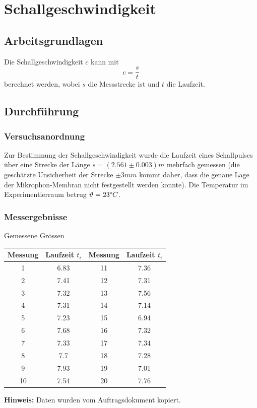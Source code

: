 \section{Schallgeschwindigkeit}

\subsection{Arbeitsgrundlagen}

Die Schallgeschwindigkeit $c$ kann mit
\[c=\frac{s}{t}\]
berechnet werden, wobei $s$ die Messstrecke ist und $t$ die Laufzeit.


\subsection{Durchf\"{u}hrung}

\subsubsection*{Versuchsanordnung}

Zur Bestimmung der Schallgeschwindigkeit wurde die Laufzeit eines Schallpulses \"{u}ber eine Strecke
der L\"{a}nge $s = (2.561 \pm 0.003) m$ mehrfach gemessen (die gesch\"{a}tzte Unsicherheit der Strecke $\pm 3 mm$
kommt daher, dass die genaue Lage der Mikrophon-Membran nicht festgestellt werden konnte). Die
Temperatur im Experimentierraum betrug $\vartheta=23 \degree C$.


\subsubsection*{Messergebnisse}
\begin{center}
    \begin{threeparttable}
        \caption{Gemessene Gr\"{o}ssen}
        \begin{tabular}{cccc}
            \toprule
            Messung & Laufzeit $t_i$ & Messung & Laufzeit $t_i$ \\
            \midrule
            1  & 6.83 & 11 & 7.36 \\
            2  & 7.41 & 12 & 7.31 \\
            3  & 7.32 & 13 & 7.56 \\
            4  & 7.31 & 14 & 7.14 \\
            5  & 7.23 & 15 & 6.94 \\
            6  & 7.68 & 16 & 7.32 \\
            7  & 7.33 & 17 & 7.34 \\
            8  & 7.7  & 18 & 7.28 \\
            9  & 7.93 & 19 & 7.01 \\
            10 & 7.54 & 20 & 7.76 \\
           \bottomrule
        \end{tabular}
        \begin{tablenotes}
            \small
            \item \textbf{Hinweis:} Daten wurden vom Auftragsdokument kopiert.
        \end{tablenotes}
    \end{threeparttable}
\end{center}


